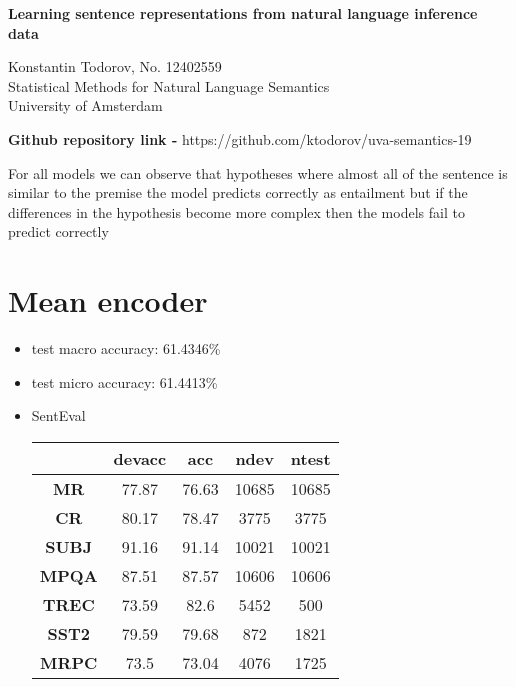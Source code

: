 \documentclass[6pt]{article}
\begin{document}
\begin{center}
  \large 
  \textbf{Learning sentence representations from natural language inference data}
  
  \normalsize Konstantin Todorov, No. 12402559 \\
  Statistical Methods for Natural Language Semantics\\
  University of Amsterdam\\
\end{center}

\textbf{Github repository link - } https://github.com/ktodorov/uva-semantics-19\\

\vspace{1\baselineskip}

For all models we can observe that hypotheses where almost all of the sentence 
is similar to the premise the model predicts correctly as entailment but if
the differences in the hypothesis become more complex then the models fail
to predict correctly

\section{Mean encoder}

\begin{itemize}
  \item test macro accuracy: 61.4346\%
  
  \item test micro accuracy: 61.4413\%
  
  \item SentEval

  \begin{center}
    \begin{tabular}{| c |c | c | c | c|} 
        \hline
        & \textbf{devacc} & \textbf{acc} & \textbf{ndev} & \textbf{ntest} \\ 
        \hline
        \textbf{MR} & 77.87 & 76.63 & 10685 & 10685 \\ 
        \hline
        \textbf{CR} & 80.17 & 78.47 & 3775 & 3775 \\
        \hline
        \textbf{SUBJ} & 91.16 & 91.14 & 10021 & 10021 \\
        \hline
        \textbf{MPQA} & 87.51 & 87.57 & 10606 & 10606 \\
        \hline
        \textbf{TREC} & 73.59 & 82.6 & 5452 & 500 \\
        \hline
        \textbf{SST2} & 79.59 & 79.68 & 872 & 1821 \\
        \hline
        \textbf{MRPC} & 73.5 & 73.04 & 4076 & 1725 \\
        \hline
      \end{tabular}
    \end{center}
\end{itemize}
\end{document}
